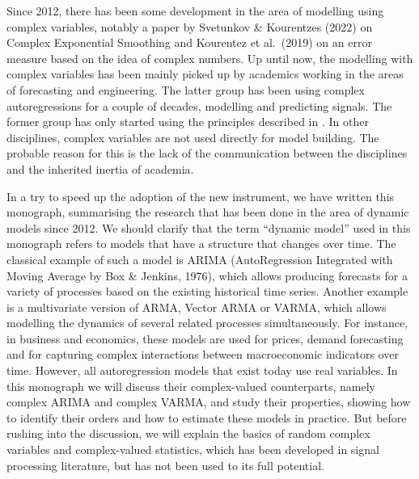 \documentclass[
]{book}
\begin{document}
Since 2012, there has been some development in the area of modelling using complex variables, notably a paper by Svetunkov \& Kourentzes (2022) on Complex Exponential Smoothing and Kourentez et al.~(2019) on an error measure based on the idea of complex numbers. Up until now, the modelling with complex variables has been mainly picked up by academics working in the areas of forecasting and engineering. The latter group has been using complex autoregressions for a couple of decades, modelling and predicting signals. The former group has only started using the principles described in \citet{Svetunkov2012}. In other disciplines, complex variables are not used directly for model building. The probable reason for this is the lack of the communication between the disciplines and the inherited inertia of academia.

In a try to speed up the adoption of the new instrument, we have written this monograph, summarising the research that has been done in the area of dynamic models since 2012. We should clarify that the term ``dynamic model'' used in this monograph refers to models that have a structure that changes over time. The classical example of such a model is ARIMA (AutoRegression Integrated with Moving Average by Box \& Jenkins, 1976), which allows producing forecasts for a variety of processes based on the existing historical time series. Another example is a multivariate version of ARMA, Vector ARMA or VARMA, which allows modelling the dynamics of several related processes simultaneously. For instance, in business and economics, these models are used for prices, demand forecasting and for capturing complex interactions between macroeconomic indicators over time.
However, all autoregression models that exist today use real variables. In this monograph we will discuss their complex-valued counterparts, namely complex ARIMA and complex VARMA, and study their properties, showing how to identify their orders and how to estimate these models in practice. But before rushing into the discussion, we will explain the basics of random complex variables and complex-valued statistics, which has been developed in signal processing literature, but has not been used to its full potential.
\end{document}
